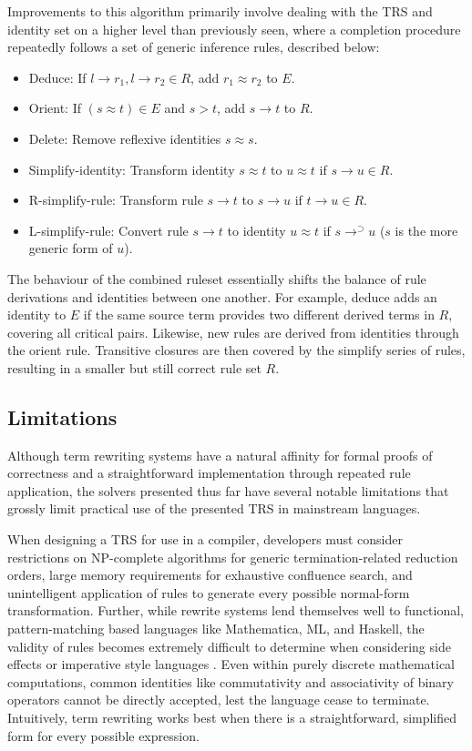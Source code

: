 \documentclass{article}
\begin{document}
Improvements to this algorithm primarily involve dealing with the TRS and identity set on a higher level than previously seen, where a completion procedure
repeatedly follows a set of generic inference rules, described below:
\begin{itemize}
    \item Deduce: If $l \rightarrow r_1, l \rightarrow r_2 \in R$, add $r_1 \approx r_2$ to $E$.
    \item Orient: If $(s \approx t) \in E$ and $s > t$, add $s \rightarrow t$ to $R$.
    \item Delete: Remove reflexive identities $s \approx s$.
    \item Simplify-identity: Transform identity $s \approx t$ to $u \approx t$ if $s \rightarrow u \in R$.
    \item R-simplify-rule: Transform rule $s \rightarrow t$ to $s \rightarrow u$ if $t \rightarrow u \in R$.
    \item L-simplify-rule: Convert rule $s \rightarrow t$ to identity $u \approx t$ if $s \rightarrow^{\supset} u$ ($s$ is the more generic form of $u$).
\end{itemize}
The behaviour of the combined ruleset essentially shifts the balance of rule derivations and identities between one another. For example, deduce adds an identity
to $E$ if the same source term provides two different derived terms in $R$, covering all critical pairs.
Likewise, new rules are derived from identities through the orient rule.
Transitive closures are then covered by the simplify series of rules, resulting in a smaller but still correct rule set $R$.

\subsection{Limitations}
Although term rewriting systems have a natural affinity for formal proofs of correctness
and a straightforward implementation through repeated rule application,
the solvers presented thus far have several notable limitations that grossly limit practical use of the presented TRS in mainstream languages.

When designing a TRS for use in a compiler, developers must consider restrictions on
NP-complete algorithms for generic termination-related reduction orders, large memory requirements for exhaustive confluence search,
and unintelligent application of rules to generate every possible normal-form transformation.
Further, while rewrite systems lend themselves well to functional, pattern-matching based languages like Mathematica, ML, and Haskell,
the validity of rules becomes extremely difficult to determine when considering side effects or imperative style languages \cite{elco1998building}.
Even within purely discrete mathematical computations, common identities like commutativity and associativity of binary operators
cannot be directly accepted, lest the language cease to terminate. Intuitively, term rewriting works best when there is a straightforward,
simplified form for every possible expression.
\end{document}
